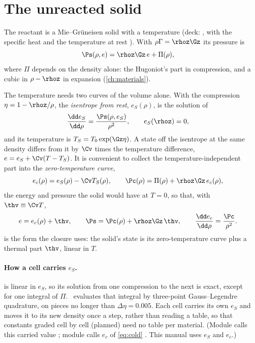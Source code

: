 \section{The unreacted solid}
\label{sec:solid}

The reactant is a Mie--Gr\"uneisen solid with a temperature (deck:
, with the specific heat  and the
temperature at rest ). With $\rho\Gamma = \rhoz\Gz$ its pressure is
\begin{equation}
  \Ps(\rho, e) = \rhoz\Gz\, e + \Pi(\rho),
  \label{eq:mg}
\end{equation}
where $\Pi$ depends on the density alone: the Hugoniot's part in
compression, and a cubic in $\rho - \rhoz$ in expansion (\cref{ch:materials}).

The temperature needs two curves of the volume alone. With the
compression $\eta = 1 - \rhoz/\rho$, the \emph{isentrope from rest},
$e_S(\rho)$, is the solution of
\begin{equation}
  \frac{\dd e_S}{\dd\rho} = \frac{\Ps(\rho, e_S)}{\rho^2},
  \qquad e_S(\rhoz) = 0,
  \label{eq:isentrope}
\end{equation}
and its temperature is $T_S = T_0\exp(\Gz\eta)$. A state off the isentrope
at the same density differs from it by $\Cv$ times the temperature
difference, $e = e_S + \Cv(T - T_S)$. It is convenient to collect the
temperature-independent part into the \emph{zero-temperature curve},
\begin{equation}
  e_c(\rho) = e_S(\rho) - \Cv T_S(\rho), \qquad
  \Pc(\rho) = \Pi(\rho) + \rhoz\Gz\, e_c(\rho),
  \label{eq:cold}
\end{equation}
the energy and pressure the solid would have at $T = 0$, so that, with
$\thv \equiv \Cv T$,
\begin{equation}
  e = e_c(\rho) + \thv, \qquad
  \Ps = \Pc(\rho) + \rhoz\Gz\,\thv, \qquad
  \frac{\dd e_c}{\dd\rho} = \frac{\Pc}{\rho^2}.
  \label{eq:solid-theta}
\end{equation}
 is the form the closure uses: the solid's state is
its zero-temperature curve plus a thermal part $\thv$, linear in $T$.

\paragraph{How a cell carries $e_S$.}  is linear in
$e_S$, so its solution from one compression to the next is exact, except for
one integral of $\Pi$. \bw\ evaluates that integral by three-point
Gauss--Legendre quadrature, on pieces no longer than $\Delta\eta = 0.005$. Each cell carries
its own $e_S$ and moves it to its new density once a step, rather than
reading a table, so that constants graded cell by cell (planned) need no
table per material. (Module  calls this carried value
; module  calls $e_c$ of \cref{eq:cold}
. This manual uses $e_S$ and $e_c$.)

